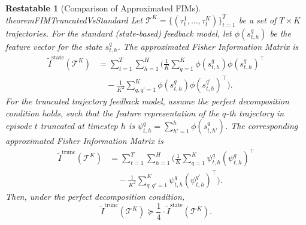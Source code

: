 \documentclass[10pt,a4paper]{amsart}
\newtheorem{restatable}{Restatable}
\begin{document}
\begin{restatable}[Comparison of Approximated FIMs]{theorem}{FIMTruncatedVsStandard}
\label{thm:fim_comparison}
Let $\mathcal{T}^K = \{ (\tau^1_t, \dots, \tau^K_t) \}_{t=1}^T$ be a set of $T \times K$ trajectories.
For the standard (state-based) feedback model, let $\phi(s^q_{t,h})$ be the feature vector for the state $s^q_{t,h}$. The approximated Fisher Information Matrix is
\begin{align*}
\tilde{I}^{\text{state}}(\mathcal{T}^K)
&= \sum_{t=1}^T \sum_{h=1}^H \Bigg( \frac{1}{K} \sum_{q=1}^K \phi(s^q_{t,h})\phi(s^q_{t,h})^\top \\
&\quad - \frac{1}{K^2} \sum_{q,q'=1}^K \phi(s^q_{t,h})\phi(s^{q'}_{t,h})^\top \Bigg).
\end{align*}
For the truncated trajectory feedback model, assume the perfect decomposition condition holds, such that the feature representation of the $q$-th trajectory in episode $t$ truncated at timestep $h$ is $\psi^q_{t,h} = \sum_{h'=1}^h \phi(s^q_{t,h'})$. The corresponding approximated Fisher Information Matrix is
\begin{align*}
\tilde{I}^{\text{trunc}}(\mathcal{T}^K)
&= \sum_{t=1}^T \sum_{h=1}^H \Bigg( \frac{1}{K} \sum_{q=1}^K \psi^q_{t,h}(\psi^q_{t,h})^\top \\
&\quad - \frac{1}{K^2} \sum_{q,q'=1}^K \psi^q_{t,h}(\psi^{q'}_{t,h})^\top \Bigg).
\end{align*}
Then, under the perfect decomposition condition,
\[ \tilde{I}^{\text{trunc}}(\mathcal{T}^K) \succeq \frac{1}{4} \cdot \tilde{I}^{\text{state}}(\mathcal{T}^K). \]
\end{restatable}
\end{document}
